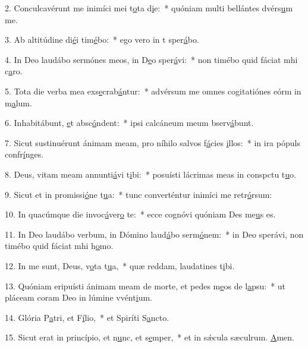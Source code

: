 2. Conculcavérunt me inimíci mei t\uline{o}ta d\uline{i}e:~* quóniam multi bellántes dvérs\uline{u}m me.\par 
3. Ab altitúdine di\uline{é}i tim\uline{é}bo:~* ego vero in t sper\uline{á}bo.\par 
4. In Deo laudábo sermónes meos, in D\uline{e}o sper\uline{á}vi:~* non timébo quid fáciat mhi c\uline{a}ro.\par 
5. Tota die verba mea exs\uline{e}crab\uline{á}ntur:~* advérsum me omnes cogitatiónes eórm in m\uline{a}lum.\par 
6. Inhabitábunt, \uline{e}t absc\uline{ó}ndent:~* ipsi calcáneum meum bserv\uline{á}bunt.\par 
7. Sicut sustinuérunt ánimam meam, pro níhilo salvos f\uline{á}cies \uline{i}llos:~* in ira pópuls confr\uline{í}nges.\par 
8. Deus, vitam meam annunti\uline{á}vi t\uline{i}bi:~* posuísti lácrimas meas in conspctu t\uline{u}o.\par 
9. Sicut et in promissi\uline{ó}ne t\uline{u}a:~* tunc converténtur inimíci me retr\uline{ó}rsum:\par 
10. In quacúmque die invoc\uline{á}ver\uline{o} te:~* ecce cognóvi quóniam Des me\uline{u}s es.\par 
11. In Deo laudábo verbum, in Dómino laud\uline{á}bo serm\uline{ó}nem:~* in Deo sperávi, non timébo quid fáciat mhi h\uline{o}mo.\par 
12. In me sunt, Deus, v\uline{o}ta t\uline{u}a,~* quæ reddam, laudatines t\uline{i}bi.\par 
13. Quóniam eripuísti ánimam meam de morte, et pedes m\uline{e}os de l\uline{a}psu:~* ut pláceam coram Deo in lúmine vvént\uline{i}um.\par 
14. Glória P\uline{a}tri, et F\uline{í}lio,~* et Spiríti S\uline{a}ncto.\par 
15. Sicut erat in princípio, et n\uline{u}nc, et s\uline{e}mper,~* et in sǽcula sæculrum. \uline{A}men.\par 
